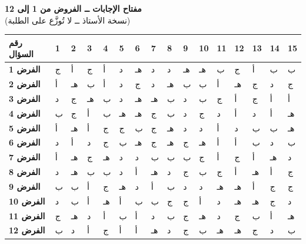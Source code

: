 \documentclass[11pt,a4paper]{article}
\begin{document}
\begin{center}
{\Large\khatt\textbf{مفتاح الإجابات ــ الفروض من 1 إلى 12}}\\[4pt]
{\small (نسخة الأستاذ ــ لا تُوزَّع على الطلبة)}\\[10pt]
\renewcommand{\arraystretch}{1.8}
\begin{tabular}{|>{\centering\arraybackslash}m{2.2cm}|*{15}{>{\centering\arraybackslash}m{0.62cm}|}}
\hline
\textbf{رقم السؤال} & \textbf{1} & \textbf{2} & \textbf{3} & \textbf{4} & \textbf{5} & \textbf{6} & \textbf{7} & \textbf{8} & \textbf{9} & \textbf{10} & \textbf{11} & \textbf{12} & \textbf{13} & \textbf{14} & \textbf{15} \\ \hline\hline
\rowcolor{red!14}\textbf{الفرض 1} & ج & أ & ج & أ & د & هـ & د & د & هـ & هـ & ب & ج & أ & ب & ب \\ \hline
\rowcolor{orange!18}\textbf{الفرض 2} & أ & هـ & ب & أ & د & ج & د & هـ & ب & ب & أ & هـ & ج & د & ج \\ \hline
\rowcolor{yellow!25}\textbf{الفرض 3} & د & ج & هـ & ب & د & هـ & هـ & ب & د & ب & ج & أ & ج & أ & أ \\ \hline
\rowcolor{lime!22}\textbf{الفرض 4} & ب & ج & أ & ب & هـ & هـ & ج & ب & د & ج & د & أ & د & أ & هـ \\ \hline
\rowcolor{green!16}\textbf{الفرض 5} & أ & هـ & أ & ج & ج & ب & ج & هـ & د & د & أ & د & ب & ب & هـ \\ \hline
\rowcolor{teal!16}\textbf{الفرض 6} & د & أ & د & ج & ب & هـ & ج & هـ & ج & هـ & أ & أ & ب & د & ب \\ \hline
\rowcolor{cyan!16}\textbf{الفرض 7} & أ & هـ & ج & هـ & د & د & ب & ب & ب & ج & أ & ج & أ & هـ & د \\ \hline
\rowcolor{blue!12}\textbf{الفرض 8} & د & هـ & ب & ب & د & أ & هـ & د & ج & ب & ج & أ & هـ & أ & ج \\ \hline
\rowcolor{violet!14}\textbf{الفرض 9} & ب & ب & أ & ج & هـ & د & أ & ب & د & د & هـ & هـ & أ & ج & ج \\ \hline
\rowcolor{purple!14}\textbf{الفرض 10} & د & ب & أ & هـ & أ & ب & ب & ج & ج & أ & د & هـ & هـ & ج & د \\ \hline
\rowcolor{magenta!14}\textbf{الفرض 11} & ج & هـ & د & أ & ب & أ & د & ب & ج & هـ & د & ج & ب & أ & هـ \\ \hline
\rowcolor{brown!18}\textbf{الفرض 12} & ب & د & أ & ج & أ & أ & هـ & د & ج & ب & هـ & هـ & ج & د & ب \\ \hline
\end{tabular}

\end{center}
\end{document}
